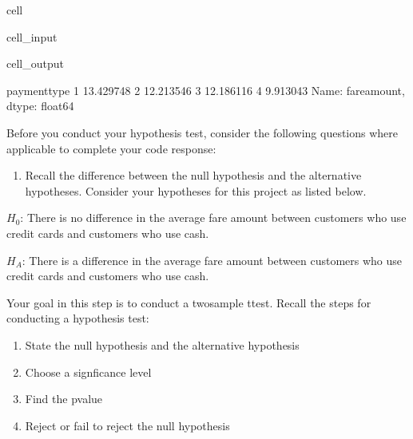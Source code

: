 \documentclass[letterpaper,10pt,english]{sphinxmanual}
\begin{document}
\begin{sphinxuseclass}{cell}
\begin{sphinxuseclass}{cell_input}
\begin{sphinxVerbatim}[commandchars=\\\{\}]
\PYG{p}{[}\PYG{p}{]}\PYG{p}{[}\PYG{p}{]}
\end{sphinxVerbatim}

\end{sphinxuseclass}
\begin{sphinxuseclass}{cell_output}
\begin{sphinxVerbatim}[commandchars=\\\{\}]
payment\PYGZus{}type
1    13.429748
2    12.213546
3    12.186116
4     9.913043
Name: fare\PYGZus{}amount, dtype: float64
\end{sphinxVerbatim}

\end{sphinxuseclass}
\end{sphinxuseclass}
\sphinxAtStartPar
Before you conduct your hypothesis test, consider the following questions where applicable to complete your code response:
\begin{enumerate}
%
\item {} 
\sphinxAtStartPar
Recall the difference between the null hypothesis and the alternative hypotheses. Consider your hypotheses for this project as listed below.

\end{enumerate}

\sphinxAtStartPar
\(H_0\): There is no difference in the average fare amount between customers who use credit cards and customers who use cash.

\sphinxAtStartPar
\(H_A\): There is a difference in the average fare amount between customers who use credit cards and customers who use cash.

\sphinxAtStartPar
Your goal in this step is to conduct a two\sphinxhyphen{}sample t\sphinxhyphen{}test. Recall the steps for conducting a hypothesis test:
\begin{enumerate}
%
\item {} 
\sphinxAtStartPar
State the null hypothesis and the alternative hypothesis

\item {} 
\sphinxAtStartPar
Choose a signficance level

\item {} 
\sphinxAtStartPar
Find the p\sphinxhyphen{}value

\item {} 
\sphinxAtStartPar
Reject or fail to reject the null hypothesis

\end{enumerate}
\end{document}
